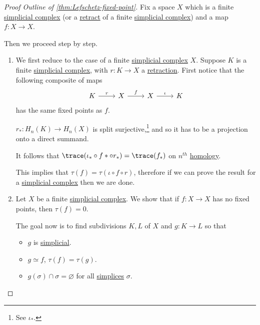 \begin{proof}[Proof Outline of \autoref{thm:Lefschetz-fixed-point}]
	Fix a space \(X\) which is a finite \hyperref[def:simplicial-complex]{simplicial complex} (or a \hyperref[def:retract]{retract}
	of a finite \hyperref[def:simplicial-complex]{simplicial complex}) and a map \(f \colon X \to X\).

	Then we proceed step by step.
	\begin{enumerate}
		\item We first reduce to the case of a finite \hyperref[def:simplicial-complex]{simplicial complex} \(X\). Suppose \(K\) is a finite
		      \hyperref[def:simplicial-complex]{simplicial complex}, with \(r \colon K \to X\) a \hyperref[def:retraction]{retraction}.
		      First notice that the following composite of maps
		      \[
			      \begin{tikzcd}
				      K & X & X & K
				      \arrow["r", from=1-1, to=1-2]
				      \arrow["f", from=1-2, to=1-3]
				      \arrow["\iota", from=1-3, to=1-4]
			      \end{tikzcd}
		      \]
		      has the same fixed points as \(f\).
		      \begin{exercise}
			      \(r_\ast \colon H_n(K) \to H_n(X)\) is split surjective,\footnote{See \(\iota_\ast\).} and so it has to be a projection onto a direct summand.
		      \end{exercise}

		      \begin{exercise}
			      It follows that \(\trace(\iota_\ast \circ f\ast \circ r_\ast) = \trace(f_\ast)\) on \(n^{th}\) \hyperref[def:homology-group]{homology}.
		      \end{exercise}

		      This implies that \(\tau(f) = \tau(\iota \circ f \circ r)\), therefore if we can prove the result for a
		      \hyperref[def:simplicial-complex]{simplicial complex} then we are done.
		\item Let \(X\) be a finite \hyperref[def:simplicial-complex]{simplicial complex}. We show that if \(f \colon X \to X\) has no fixed points, then \(\tau(f) = 0\).

		      The goal now is to find subdivisions \(K, L\) of \(X\) and \(g \colon K \to L\) so that
		      \begin{itemize}
			      \item \(g\) is \hyperref[def:simplicial-map]{simplicial}.
			      \item \(g \simeq f\), \(\tau(f) = \tau(g)\).
			      \item \(g(\sigma) \cap \sigma = \varnothing \) for all \hyperref[def:standard-simplex]{simplices} \(\sigma\).
		      \end{itemize}


\end{enumerate}
\end{proof}

